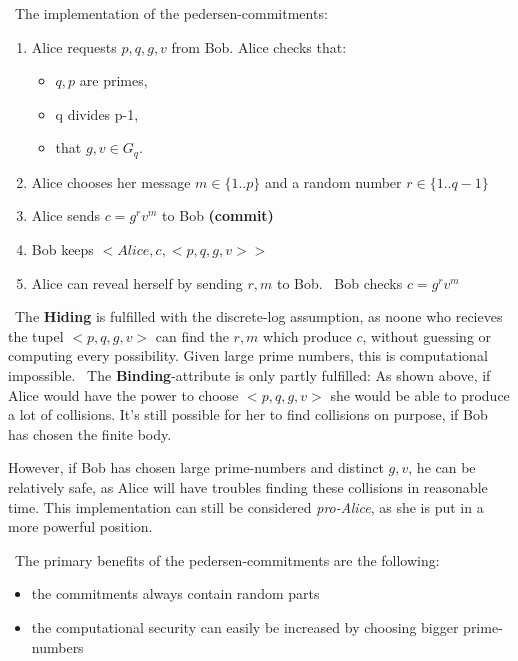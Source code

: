 ~\newline The implementation of the pedersen-commitments: 
	\begin{enumerate}
		\item Alice requests $p,q,g,v$ from Bob. \newline Alice checks that:
		\begin{itemize}
			\item $q,p$ are primes, 
			\item q divides p-1, 
			\item that $g,v \in G_q$. 
		\end{itemize}
		\item Alice chooses her message $m \in \{1..p\}$ and a random number $r \in \{1..q-1\}$
		\item Alice sends $c = g^rv^m$ to Bob \textbf{(commit)}
		\item Bob keeps $<Alice,c,<p,q,g,v>>$
		\item Alice can reveal herself by sending $r,m$ to Bob. ~\newline Bob checks $c = g^rv^m$
	\end{enumerate}

~\newline The \textbf{Hiding} is fulfilled with the discrete-log assumption, as noone who recieves the tupel $<p,q,g,v>$ can find the $r,m$ which produce $c$, without guessing or computing every possibility. Given large prime numbers, this is computational impossible. 
~\newline The \textbf{Binding}-attribute is only partly fulfilled: As shown above, if Alice would have the power to choose $<p,q,g,v>$ she would be able to produce a lot of collisions. It's still possible for her to find collisions on purpose, if Bob has chosen the finite body. 

However, if Bob has chosen large prime-numbers and distinct $g,v$, he can be relatively safe, as Alice will have troubles finding these collisions in reasonable time. This implementation can still be considered \textit{pro-Alice}, as she is put in a more powerful position.    

~\newline The primary benefits of the pedersen-commitments are the following: 
\begin{itemize}
	\item the commitments always contain random parts
	\item the computational security can easily be increased by choosing bigger prime-numbers
\end{itemize}
